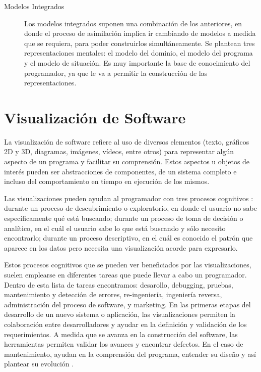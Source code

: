 \begin{description}
    \item[Modelos Integrados] Los modelos integrados suponen una combinación de los
    anteriores, en donde el proceso de asimilación implica ir cambiando de
    modelos a medida que se requiera, para poder construirlos simultáneamente.
    Se plantean tres representaciones mentales: el modelo del dominio, el modelo del
    programa y el modelo de situación.
    Es muy importante la base de conocimiento del programador, ya que le va a permitir
    la construcción de las representaciones.

\end{description}

\section{Visualización de Software}

La visualización de software refiere al uso de diversos elementos (texto, 
gráficos 2D y 3D, diagramas, imágenes, vídeos, entre otros) para representar algún
aspecto de un programa y facilitar su comprensión.\cite{PetreDeQuency06}\cite{[GH01]Che06]}
Estos aspectos u objetos de interés pueden ser abstracciones de componentes, de
un sistema completo e incluso del comportamiento en tiempo en ejecución de los
mismos. \cite{TeysereCampo09}

Las visualizaciones pueden ayudan al programador con tres procesos cognitivos
\cite{ButlerAlmond93}:
durante un proceso de descubrimiento o exploratorio, en donde el usuario no
sabe específicamente qué está buscando;
durante un proceso de toma de decisión o analítico, en el cuál el usuario sabe lo que
está buscando y sólo necesito encontrarlo;
durante un proceso descriptivo, en el cuál es conocido el patrón que aparece en los
datos pero necesita una visualización acorde para expresarlo.

Estos procesos cognitivos que se pueden ver beneficiados por las visualizaciones, suelen
emplearse en diferentes tareas que puede llevar a cabo un programador.
Dentro de esta lista de tareas \cite{MalleticMarcusCollard02} encontramos: desarollo,
debugging, pruebas, mantenimiento y detección de errores, re-ingeniería, ingeniería reversa,
administración del proceso de software, y marketing.
En las primeras etapas del desarrollo de un nuevo sistema o aplicación, las visualizaciones
permiten la colaboración entre desarrolladores y ayudar en la definición y validación de los
requerimientos.
A medida que se avanza en la construcción del software, las herramientas permiten validar
los avances y encontrar defectos.
En el caso de mantenimiento, ayudan en la comprensión del programa, entender su diseño y
así plantear su evolución \cite{PetreDeQuency06}.

